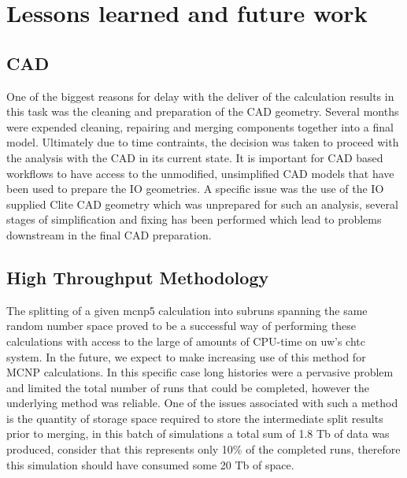 \documentclass[12pt]{article}
\begin{document}

\newpage
\clearpage
\section{Lessons learned and future work}
\subsection*{CAD}
One of the biggest reasons for delay with the deliver of the calculation results
in this task was the cleaning and preparation of the CAD geometry. Several
months were expended cleaning, repairing and merging components together into a
final model. Ultimately due to time contraints, the decision was taken to
proceed with the analysis with the CAD in its current state. It is important
for CAD based workflows to have access to the unmodified, unsimplified CAD
models that have been used to prepare the IO geometries. A specific issue
was the use of the IO supplied Clite CAD geometry which was unprepared for
such an analysis, several stages of simplification and fixing has been performed
which lead to problems downstream in the final CAD preparation.

\subsection*{High Throughput Methodology}
The splitting of a given \gls{mcnp5} calculation into subruns spanning the same random
number space proved to be a successful way of performing these calculations with
access to the large of amounts of CPU-time on \gls{uw}'s \gls{chtc} system. In
the future, we expect to make increasing use of this method for MCNP
calculations. In this specific case long histories were a pervasive problem and
limited the total number of runs that could be completed, however the underlying
method was reliable. One of the issues associated with such a method is the
quantity of storage space required to store the intermediate split results prior
to merging, in this batch of simulations a total sum of 1.8 Tb of data was
produced, consider that this represents only 10\% of the completed runs,
therefore this simulation should have consumed some 20 Tb of space.
\end{document}
